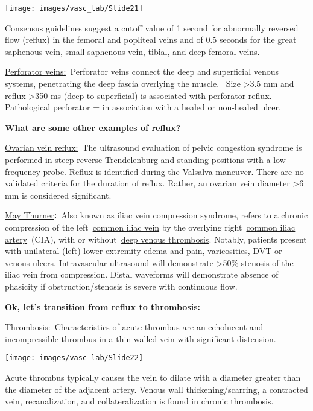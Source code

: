 \documentclass[
]{book}
\begin{document}
\texttt{[image: images/vasc\_lab/Slide21]}

Consensus guidelines suggest a cutoff value of 1 second for abnormally
reversed flow (reflux) in the femoral and popliteal veins and of 0.5
seconds for the great saphenous vein, small saphenous vein, tibial, and
deep femoral veins.

\uline{Perforator veins:}~Perforator veins connect the deep and
superficial venous systems, penetrating the deep fascia overlying the
muscle.~ Size \textgreater3.5 mm and reflux \textgreater350 ms (deep to superficial) is
associated with perforator reflux. Pathological perforator = in
association with a healed or non-healed ulcer.

\textbf{What are some other examples of reflux?}

\uline{Ovarian vein reflux:}~The ultrasound evaluation of pelvic
congestion syndrome is performed in steep reverse Trendelenburg and
standing positions with a low-frequency probe. Reflux is identified
during the Valsalva maneuver. There are no validated criteria for the
duration of reflux. Rather, an ovarian vein diameter \textgreater6 mm is
considered significant.

\uline{May Thurner}\textbf{:}~Also known as iliac vein compression
syndrome, refers to a chronic compression of the left~\href{https://radiopaedia.org/articles/common-iliac-vein?lang=us}{common iliac
vein} by the
overlying right~\href{https://radiopaedia.org/articles/common-iliac-artery?lang=us}{common iliac
artery}~(CIA),
with or without~\href{https://radiopaedia.org/articles/deep-vein-thrombosis?lang=us}{deep venous
thrombosis}.
Notably, patients present with unilateral (left) lower extremity edema
and pain, varicosities, DVT or venous ulcers. Intravascular ultrasound
will demonstrate \textgreater50\% stenosis of the iliac vein from compression.
Distal waveforms will demonstrate absence of phasicity if
obstruction/stenosis is severe with continuous flow.

\textbf{Ok, let's transition from reflux to thrombosis:}

\uline{Thrombosis:}~Characteristics of acute thrombus are an
echolucent and incompressible thrombus in a thin-walled vein with
significant distension.

\texttt{[image: images/vasc\_lab/Slide22]}

Acute thrombus typically causes the vein to dilate with a diameter
greater than the diameter of the adjacent artery. Venous wall
thickening/scarring, a contracted vein, recanalization, and
collateralization is found in chronic thrombosis.
\end{document}
